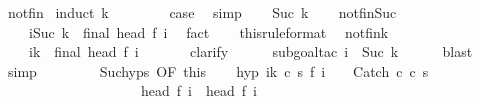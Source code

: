 \begin{isabellebody}
%
\isadelimproof
%
\endisadelimproof
%
\isatagproof
{}\isamarkupfalse%
\ not{\isacharunderscore}fin\isanewline
{}\isamarkupfalse%
\ {\isacharparenleft}induct\ k{\isacharparenright}\isanewline
\ \ \isamarkupfalse%
\ {}\isanewline
\ \ \isamarkupfalse%
\ {\isacharquery}case\ \isamarkupfalse%
\ simp\isanewline
{}\isamarkupfalse%
\isanewline
\ \ \isamarkupfalse%
\ {\isacharparenleft}Suc\ k{\isacharparenright}\isanewline
\ \ \isamarkupfalse%
\ not{\isacharunderscore}fin{\isacharunderscore}Suc{\isacharcolon}\ \isanewline
\ \ \ \ {\isachardoublequoteopen}{\isasymforall}i{\isacharless}Suc\ k{\isachardot}\ {\isasymnot}\ final\ {\isacharparenleft}head\ {\isacharparenleft}f\ i{\isacharparenright}{\isacharparenright}{\isachardoublequoteclose}\ \isamarkupfalse%
\ fact\isanewline
\ \ \isamarkupfalse%
\ this{\isacharbrackleft}rule{\isacharunderscore}format{\isacharbrackright}\ \isamarkupfalse%
\ not{\isacharunderscore}fin{\isacharunderscore}k{\isacharcolon}\ \isanewline
\ \ \ \ {\isachardoublequoteopen}{\isasymforall}i{\isacharless}k{\isachardot}\ {\isasymnot}\ final\ {\isacharparenleft}head\ {\isacharparenleft}f\ i{\isacharparenright}{\isacharparenright}{\isachardoublequoteclose}\ \isanewline
\ \ \ \ \isamarkupfalse%
\ clarify\isanewline
\ \ \ \ \isamarkupfalse%
\ {\isacharparenleft}subgoal{\isacharunderscore}tac\ {\isachardoublequoteopen}i\ {\isacharless}\ Suc\ k{\isachardoublequoteclose}{\isacharparenright}\isanewline
\ \ \ \ \isamarkupfalse%
\ blast\isanewline
\ \ \ \ \isamarkupfalse%
\ simp\isanewline
\ \ \ \ \isamarkupfalse%
\isanewline
\isanewline
\ \ \isamarkupfalse%
\ Suc{\isachardot}hyps\ {\isacharbrackleft}OF\ this{\isacharbrackright}\isanewline
\ \ \isamarkupfalse%
\ hyp{\isacharcolon}\ {\isachardoublequoteopen}{\isasymforall}i{\isacharless}k{\isachardot}\ {\isacharparenleft}{\isasymexists}c{\isacharprime}\ s{\isacharprime}{\isachardot}\ f\ {\isacharparenleft}i\ {\isacharplus}\ {}{\isacharparenright}\ {\isacharequal}\ {\isacharparenleft}Catch\ c{\isacharprime}\ c\ s{\isacharprime}{\isacharparenright}{\isacharparenright}\ {\isasymand}\ \isanewline
\ \ \ \ \ \ \ \ \ \ \ \ \ \ \ \ \ \ \ {\isasymGamma}{\isasymturnstile}\ head\ {\isacharparenleft}f\ i{\isacharparenright}\ {\isasymrightarrow}\ head\ {\isacharparenleft}f\ {\isacharparenleft}i\ {\isacharplus}\ {}{\isacharparenright}{\isacharparenright}{\isachardoublequoteclose}\isacommand{{\isachardot}}\isamarkupfalse%

\end{isabellebody}
